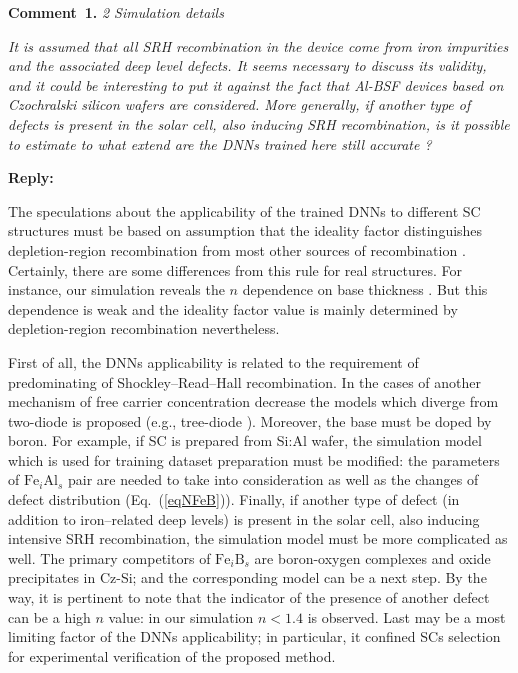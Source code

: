 \documentclass[num-refs]{wiley-article} %
\begin{document}
\textcolor[rgb]{0.00,0.50,1.00}{\textbf{Comment~1.}}
\emph{2 Simulation details}

\emph{It is assumed that all SRH recombination in the device come from iron impurities and the associated deep level defects.
It seems necessary to discuss its validity, and it could be interesting to put it against the fact that Al-BSF devices based on Czochralski silicon wafers are considered.
More generally, if another type of defects is present in the solar cell, also inducing SRH recombination,
is it possible to estimate to what extend are the DNNs trained here still accurate ? }

\vspace{0.5cm}
\noindent
\textcolor[rgb]{0.51,0.00,0.00}{\textbf{Reply:}}

The speculations about the applicability of the trained DNNs to different SC structures
must be based on assumption that the ideality factor distinguishes
depletion-region recombination from most other sources of recombination \cite{Breitenstein2013,n2McIntosh}.
Certainly, there are some differences from this rule for real structures.
For instance, our simulation reveals the $n$ dependence on base thickness \cite{OlikhJPS}.
But this dependence is weak and the ideality factor value is mainly determined
by depletion-region recombination nevertheless.

First of all, the DNNs applicability is related to the requirement of
predominating of Shockley–Read–Hall recombination.
In the cases of another mechanism of free carrier concentration decrease the
models which diverge from two-diode is proposed (e.g., tree-diode \cite{TreeDiode,Shah}).
Moreover, the base must be doped by boron.
For example, if SC is prepared from Si:Al wafer,
the simulation model which is used for training dataset preparation must
be modified: the parameters of $\mathrm{Fe}_i\mathrm{Al}_s$ pair are needed
to take into consideration as well as the changes of defect
distribution (Eq.~(\ref{eqNFeB})).
Finally, if another type of defect (in addition to iron--related deep levels)
is present in the solar cell, also inducing intensive SRH recombination,
the simulation model must be more complicated as well.
The primary competitors of $\mathrm{Fe}_i\mathrm{B}_s$  are  boron-oxygen complexes \cite{LIDRev,LIDRev2}
and oxide precipitates \cite{MurphySC2014,Oxide:Chen} in Cz-Si;
and the corresponding model can be a next step.
By the way, it is pertinent to note that the indicator of the presence of another defect
can be a high $n$ value:
in our simulation $n<1.4$ is observed.
Last may be a most limiting factor of the DNNs applicability;
in particular, it confined SCs selection for experimental verification of the proposed method.
\end{document}
